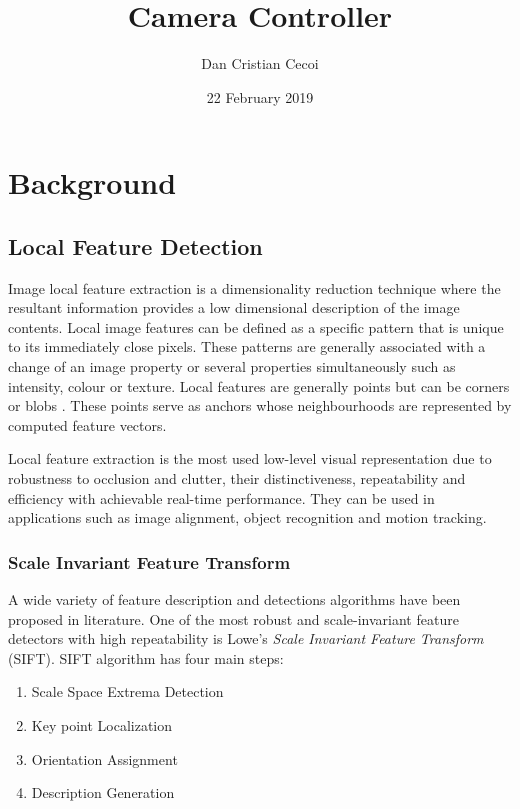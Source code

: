 \documentclass{l4proj}
\begin{document}
\title{Camera Controller}
\author{Dan Cristian Cecoi}
\date{22 February 2019}

\maketitle


\chapter{Background}

\section{Local Feature Detection}

Image local feature extraction is a dimensionality reduction technique where the resultant information provides a low dimensional description of the image contents. Local image features can be defined as a specific pattern that is unique to its immediately close pixels. These patterns are generally associated with a change of an image property or several properties simultaneously such as intensity, colour or texture. Local features are generally points but can be corners or blobs \citep{Tinne08}. These points serve as anchors whose neighbourhoods are represented by computed feature vectors. 

Local feature extraction is the most used low-level visual representation due to robustness to occlusion and clutter, their distinctiveness, repeatability and efficiency with achievable real-time performance. They can be used in applications such as image alignment, object recognition and motion tracking.   


\subsection{Scale Invariant Feature Transform}

A wide variety of feature description and detections algorithms have been proposed in literature. One of the most robust and scale-invariant feature detectors with high repeatability is Lowe's \textit{Scale Invariant Feature Transform} (SIFT). SIFT algorithm has four main steps:





\begin{enumerate}
  \item Scale Space Extrema Detection
  \item Key point Localization
  \item Orientation Assignment
  \item Description Generation 
\end{enumerate}
\end{document}
